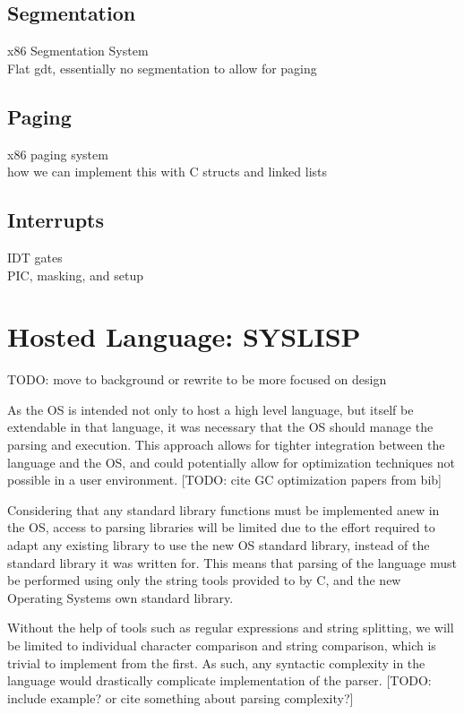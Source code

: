 \documentclass[11pt]{report}
\begin{document}
\subsection{Segmentation}
x86 Segmentation System \\
Flat gdt, essentially no segmentation to allow for paging \\

\subsection{Paging}
x86 paging system \\
how we can implement this with C structs and linked lists \\

\subsection{Interrupts}
IDT gates \\
PIC, masking, and setup \\

\section{Hosted Language: SYSLISP}
TODO: move to background or rewrite to be more focused on design

As the OS is intended not only to host a high level language, but itself be extendable in that language, it was necessary that the OS should manage the parsing and execution. This approach allows for tighter integration between the language and the OS, and could potentially allow for optimization techniques not possible in a user environment. [TODO: cite GC optimization papers from bib]

Considering that any standard library functions must be implemented anew in the OS, access to parsing libraries will be limited due to the effort required to adapt any existing library to use the new OS standard library, instead of the standard library it was written for. This means that parsing of the language must be performed using only the string tools provided to by C, and the new Operating Systems own standard library.

Without the help of tools such as regular expressions and string splitting, we will be limited to individual character comparison and string comparison, which is trivial to implement from the first. As such, any syntactic complexity in the language would drastically complicate implementation of the parser. [TODO: include example? or cite something about parsing complexity?]
\end{document}
